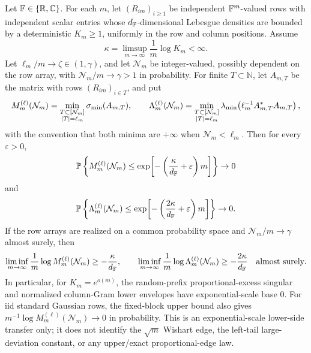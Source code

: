 \begin{corollary}\label{rect:random-prefix-proportional-density-rate}
Let \(\mathbb{F}\in\{\mathbb{R},\mathbb{C}\}\).  For each \(m\), let
\((R_{im})_{i\ge1}\) be independent \(\mathbb{F}^m\)-valued rows with independent
scalar entries whose \(d_{\mathbb{F}}\)-dimensional Lebesgue densities are bounded by a
deterministic \(K_m\ge1\), uniformly in the row and column positions.  Assume
\[
  \kappa=\limsup_{m\to\infty}\frac1m\log K_m<\infty .
\]
Let \(\ell_m/m\to\zeta\in(1,\gamma)\), and let \(\mathcal N_m\) be
integer-valued, possibly dependent on the row array, with
\(\mathcal N_m/m\to\gamma>1\) in probability.  For finite
\(T\subset\mathbb N\), let \(A_{m,T}\) be the matrix with rows
\((R_{im})_{i\in T}\), and put
\[
  M_m^{(\ell)}(\mathcal N_m)
  =
  \min_{\substack{T\subset[\mathcal N_m]\\ |T|=\ell_m}}\sigma_{\min}(A_{m,T}),
  \qquad
  \Lambda_m^{(\ell)}(\mathcal N_m)
  =
  \min_{\substack{T\subset[\mathcal N_m]\\ |T|=\ell_m}}
  \lambda_{\min}\!\left(\ell_m^{-1}A_{m,T}^*A_{m,T}\right),
\]
with the convention that both minima are \(+\infty\) when
\(\mathcal N_m<\ell_m\).  Then for every \(\varepsilon>0\),
\[
  \mathbb{P}\left\{
  M_m^{(\ell)}(\mathcal N_m)\le
  \exp\!\left[-\left(\frac{\kappa}{d_{\mathbb{F}}}+\varepsilon\right)m\right]
  \right\}\to0
\]
and
\[
  \mathbb{P}\left\{
  \Lambda_m^{(\ell)}(\mathcal N_m)\le
  \exp\!\left[-\left(\frac{2\kappa}{d_{\mathbb{F}}}+\varepsilon\right)m\right]
  \right\}\to0 .
\]
If the row arrays are realized on a common probability space and
\(\mathcal N_m/m\to\gamma\) almost surely, then
\[
  \liminf_{m\to\infty}\frac1m\log M_m^{(\ell)}(\mathcal N_m)
  \ge-\frac{\kappa}{d_{\mathbb{F}}},
  \qquad
  \liminf_{m\to\infty}\frac1m\log \Lambda_m^{(\ell)}(\mathcal N_m)
  \ge-\frac{2\kappa}{d_{\mathbb{F}}}
  \quad\hbox{almost surely}.
\]
In particular, for \(K_m=e^{o(m)}\), the random-prefix proportional-excess
singular and normalized column-Gram lower envelopes have exponential-scale base
\(0\).  For iid standard Gaussian rows, the fixed-block upper bound also gives
\(m^{-1}\log M_m^{(\ell)}(\mathcal N_m)\to0\) in probability.  This is an
exponential-scale lower-side transfer only; it does not identify the
\(\sqrt m\) Wishart edge, the left-tail large-deviation constant, or any
upper/exact proportional-edge law.
\end{corollary}

